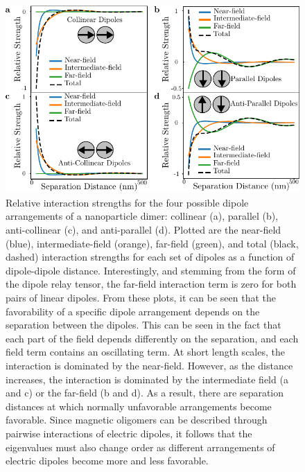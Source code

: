 \documentclass[journal=apchd5,manuscript=article]{achemso}
\begin{document}
\begin{figure}
\centering
\includegraphics[width=5in]{dimer_interaction.pdf}
\caption{Relative interaction strengths for the four possible dipole arrangements of a nanoparticle dimer: collinear (a), parallel (b), anti-collinear (c), and anti-parallel (d). Plotted are the near-field (blue), intermediate-field (orange), far-field (green), and total (black, dashed) interaction strengths for each set of dipoles as a function of dipole-dipole distance. Interestingly, and stemming from the form of the dipole relay tensor, the far-field interaction term is zero for both pairs of linear dipoles. From these plots, it can be seen that the favorability of a specific dipole arrangement depends on the separation between the dipoles. This can be seen in the fact that each part of the field depends differently on the separation, and each field term contains an oscillating term. At short length scales, the interaction is dominated by the near-field. However, as the distance increases, the interaction is dominated by the intermediate field (a and c) or the far-field (b and d). As a result, there are separation distances at which normally unfavorable arrangements become favorable. Since magnetic oligomers can be described through pairwise interactions of electric dipoles, it follows that the eigenvalues must also change order as different arrangements of electric dipoles become more and less favorable.}
\label{dimers}
\end{figure}
\end{document}
